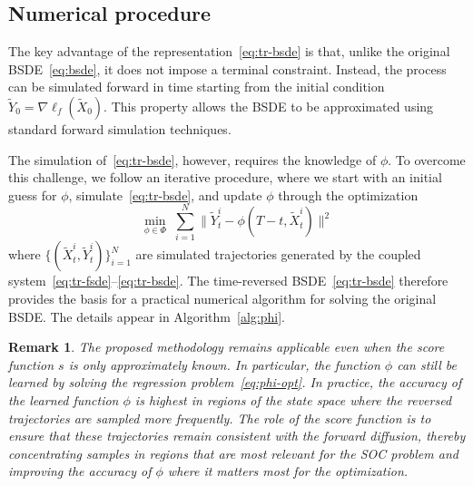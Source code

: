 \documentclass[letterpaper, 10 pt, conference]{ieeeconf}  %
\newtheorem{remark}{Remark}
\newcommand{\Xr}{\tilde X}
\newcommand{\Yr}{\tilde Y}
\begin{document}
\subsection{Numerical procedure}
The key advantage of the representation~\eqref{eq:tr-bsde} is that, unlike the original BSDE~\eqref{eq:bsde}, it does not impose a terminal constraint.  
Instead, the process can be simulated forward in time starting from the initial condition $\Yr_0=\nabla \ell_f(\Xr_0)$.  
This property allows the BSDE to be approximated using standard forward simulation techniques. 

The simulation of~\eqref{eq:tr-bsde}, however, requires the knowledge of $\phi$. To overcome this challenge, we follow an iterative procedure, where we start with an initial guess for $\phi$, simulate~\eqref{eq:tr-bsde}, and update $\phi$ through the optimization 
\begin{equation}\label{eq:phi-opt}
    \min_{\phi \in \Phi}\; \sum_{i=1}^N \|\Yr_t^i - \phi(T-t,\Xr_t^i)\|^2
\end{equation}
where $\{(\Xr_t^i,\Yr_t^i)\}_{i=1}^N$ are simulated trajectories generated by the coupled system~\eqref{eq:tr-fsde}--\eqref{eq:tr-bsde}. The time-reversed BSDE~\eqref{eq:tr-bsde} therefore provides the basis for a practical numerical algorithm for solving the original BSDE.  
The details appear in Algorithm~\ref{alg:phi}. 

\begin{remark}
The proposed methodology remains applicable even when the score function $s$ 
is only approximately known. In particular, the function 
$\phi$ can still be learned by solving the regression problem~\eqref{eq:phi-opt}. In practice, the accuracy of the learned function $\phi$ is highest in regions of the state space where the reversed trajectories are sampled more frequently. The role of the score function is to ensure that these trajectories remain consistent with the forward diffusion, thereby concentrating samples in regions that are most relevant for the SOC problem and improving the accuracy of $\phi$ where it matters most for the optimization.
\end{remark}
\end{document}
